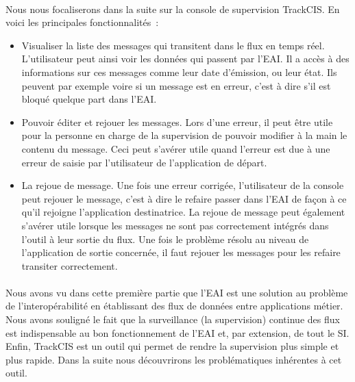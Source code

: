 			\paragraph{}%
			Nous nous focaliserons dans la suite sur la console de supervision TrackCIS.
			En voici les principales fonctionnalités~:
			\begin{itemize}
			  \item Visualiser la liste des messages qui transitent dans le flux en temps
			  réel. L'utilisateur peut ainsi voir les données qui passent par l'EAI. Il
			  a accès à des informations sur ces messages comme leur date d'émission, ou
			  leur état. Ils peuvent par exemple voire si un message est en erreur, c'est
			  à dire s'il est bloqué quelque part dans l'EAI.
			  \item Pouvoir éditer et rejouer les messages. Lors d'une erreur, il peut
			  être utile pour la personne en charge de la supervision de pouvoir modifier
			  à la main le contenu du message. Ceci peut s'avérer utile quand l'erreur
			  est due à une erreur de saisie par l'utilisateur de l'application de
			  départ.
			  \item La rejoue de message. Une fois une erreur corrigée, l'utilisateur de
			  la console peut rejouer le message, c'est à dire le refaire passer dans
			  l'EAI de façon à ce qu'il rejoigne l'application destinatrice. La rejoue de
			  message peut également s'avérer utile lorsque les messages ne sont pas
			  correctement intégrés dans l'outil à leur sortie du flux. Une fois le
			  problème résolu au niveau de l'application de sortie concernée, il faut
			  rejouer les messages pour les refaire transiter correctement.
			\end{itemize}
		
		\paragraph{}%
		Nous avons vu dans cette première partie que l'EAI est une solution au
		problème de l'interopérabilité en établissant des flux de données entre
		applications métier. Nous avons souligné le fait que la surveillance (la
		supervision) continue des flux est indispensable au bon fonctionnement de
		l'EAI et, par extension, de tout le SI. Enfin, TrackCIS est un outil qui
		permet de rendre la supervision plus simple et plus rapide.\newline
		Dans la suite nous découvrirons les problématiques inhérentes à cet outil.
		
